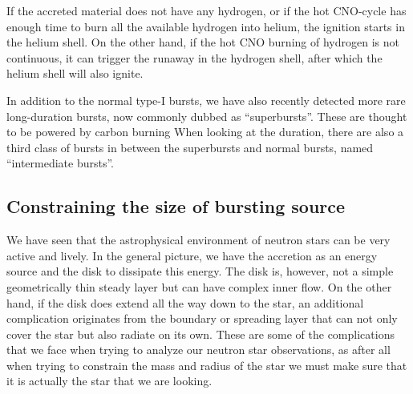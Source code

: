 If the accreted material does not have any hydrogen, or if the hot CNO-cycle has enough time to burn all the available hydrogen into helium, the ignition starts in the helium shell.
On the other hand, if the hot CNO burning of hydrogen is not continuous, it can trigger the runaway in the hydrogen shell, after which the helium shell will also ignite.


In addition to the normal type-I bursts, we have also recently detected more rare long-duration bursts, now commonly dubbed as ``superbursts''. \cite{CHK00, Kuulkers02, SB02}
These are thought to be powered by carbon burning\cite{Cumming01}
When looking at the duration, there are also a third class of bursts in between the superbursts and normal bursts, named ``intermediate bursts''.\cite{Cumming06}




\subsection{Constraining the size of bursting source}

We have seen that the astrophysical environment of neutron stars can be very active and lively.
In the general picture, we have the accretion as an energy source and the disk to dissipate this energy.
The disk is, however, not a simple geometrically thin steady layer but can have complex inner flow.
On the other hand, if the disk does extend all the way down to the star, an additional complication originates from the boundary or spreading layer that can not only cover the star but also radiate on its own.
These are some of the complications that we face when trying to analyze our neutron star observations, as after all when trying to constrain the mass and radius of the star we must make sure that it is actually the star that we are looking.



